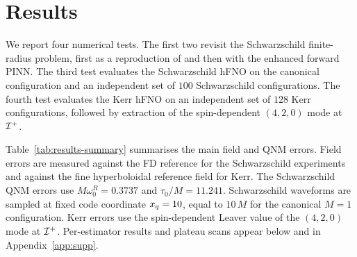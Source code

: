 ﻿%
\section{Results}\label{sec:results}

We report four numerical tests. The first two revisit
the Schwarzschild finite-radius problem, first as a reproduction of
\citet{Patel2024pinn} and then with the enhanced
forward PINN. The third test evaluates the Schwarzschild hFNO on the
canonical configuration and an independent set of $100$
Schwarzschild configurations. The fourth test evaluates the Kerr hFNO
on an independent set of $128$ Kerr configurations,
followed by extraction of the spin-dependent $(4,2,0)$ mode at
$\mathcal{I}^{+}$.

Table~\ref{tab:results-summary} summarises the main field and QNM
errors. Field errors are measured against the FD reference for the
Schwarzschild experiments and against the fine hyperboloidal
reference field for Kerr. The Schwarzschild QNM errors use
$M\omega_0^R = 0.3737$ and $\tau_0/M = 11.241$. Schwarzschild
waveforms are sampled at fixed code coordinate $x_{q}=10$, equal to
$10\,M$ for the canonical $M=1$ configuration.
Kerr errors use the spin-dependent Leaver value of the $(4,2,0)$ mode
at $\mathcal{I}^{+}$. Per-estimator results and plateau scans appear below and
in Appendix~\ref{app:supp}.

